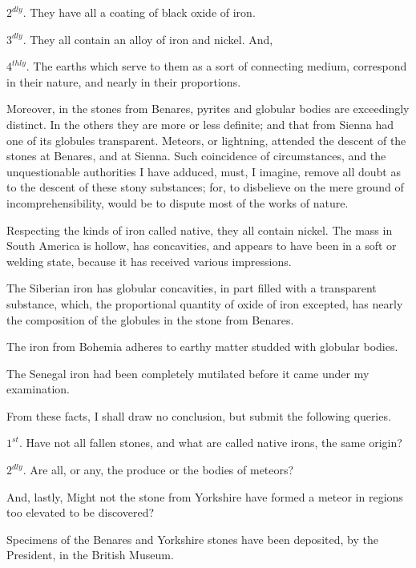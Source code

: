 \documentclass[a4paper, 12pt, oneside]{article}
\begin{document}
$2^{dly}$. They have all a coating of black oxide of iron.

$3^{dly}$. They all contain an alloy of iron and nickel. And,

$4^{thly}$. The earths which serve to them as a sort of connecting medium, correspond in their nature, and nearly in their proportions.

Moreover, in the stones from Benares, pyrites and globular bodies are exceedingly distinct. In the others they are more or less definite; and that from Sienna had one of its globules transparent. Meteors, or lightning, attended the descent of the stones at Benares, and at Sienna. Such coincidence of circumstances, and the unquestionable authorities I have adduced, must, I imagine, remove all doubt as to the descent of these stony substances; for, to disbelieve on the mere ground of incomprehensibility, would be to dispute most of the works of nature.

Respecting the kinds of iron called native, they all contain nickel. The mass in South America is hollow, has concavities, and appears to have been in a soft or welding state, because it has received various impressions.

The Siberian iron has globular concavities, in part filled with a transparent substance, which, the proportional quantity of oxide of iron excepted, has nearly the composition of the globules in the stone from Benares.

The iron from Bohemia adheres to earthy matter studded with globular bodies.

The Senegal iron had been completely mutilated before it came under my examination.

From these facts, I shall draw no conclusion, but submit the following queries.

$1^{st}$. Have not all fallen stones, and what are called native irons, the same origin?

$2^{dly}$. Are all, or any, the produce or the bodies of meteors?

And, lastly, Might not the stone from Yorkshire have formed a meteor in regions too elevated to be discovered?

Specimens of the Benares and Yorkshire stones have been deposited, by the President, in the British Museum.
\end{document}
